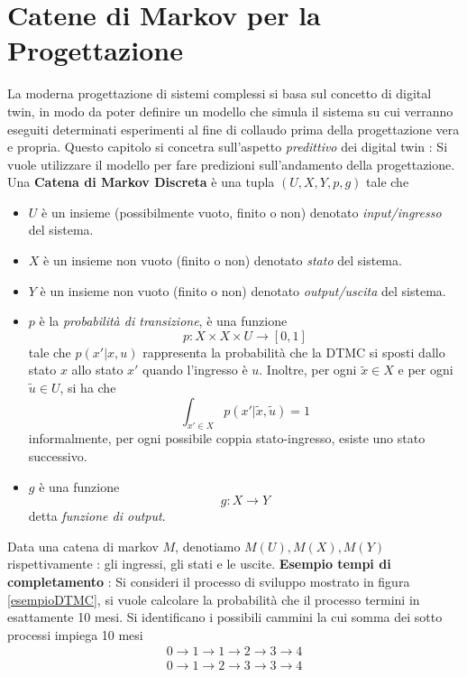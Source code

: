 \documentclass[10pt, letterpaper]{report}
\begin{document}
\section{Catene di Markov per la Progettazione}
La moderna progettazione di sistemi complessi si basa sul concetto di digital twin, in modo da poter  
definire un modello che simula il sistema su cui verranno eseguiti determinati esperimenti al fine 
di collaudo prima della progettazione vera e propria. Questo capitolo si concetra sull'aspetto \textit{predittivo} 
dei digital twin : Si vuole utilizzare il modello per fare predizioni sull'andamento della 
progettazione.\acc
{} Una \textbf{Catena di Markov Discreta} è una tupla $(U,X,Y,p,g)$ tale che \begin{itemize}
    \item $U$ è un insieme (possibilmente vuoto, finito o non) denotato \textit{input/ingresso} del sistema.
    \item $X$ è un insieme non vuoto  (finito o non) denotato \textit{stato} del sistema.
    \item $Y$ è un insieme non vuoto (finito o non) denotato \textit{output/uscita} del sistema.
    \item $p$ è la \textit{probabilità di transizione}, è una funzione $$p:X\times X\times U\rightarrow[0,1]$$
    tale che $p(x'|x,u)$ rappresenta la probabilità che la DTMC si sposti dallo stato $x$ allo 
    stato $x'$ quando l'ingresso è $u$. Inoltre, per ogni $\tilde x\in X$ e per ogni $\tilde u\in U$, 
    si ha che $$ \int_{x'\in X}p(x'|\tilde x,\tilde u)=1$$
    informalmente, per ogni possibile coppia stato-ingresso, esiste uno stato successivo. 
    \item $g$ è una funzione $$g:X\rightarrow Y$$ detta \textit{funzione di output}.
\end{itemize}
Data una catena di markov $M$, denotiamo $M(U), M(X), M(Y)$ rispettivamente : gli ingressi, gli stati 
e le uscite.\acc 
\textbf{Esempio tempi di completamento} : Si consideri il processo di sviluppo mostrato in figura \ref{esempioDTMC}, si vuole 
calcolare la probabilità che il processo termini in esattamente 10 mesi.\acc 
Si identificano i possibili cammini la cui somma dei sotto processi impiega 10 mesi 
$$ \begin{matrix}
    0\rightarrow 1 \rightarrow  1 \rightarrow2\rightarrow3\rightarrow4 \\
    0\rightarrow 1  \rightarrow2\rightarrow3\rightarrow3\rightarrow4 \\ 
\end{matrix}$$
\end{document}
